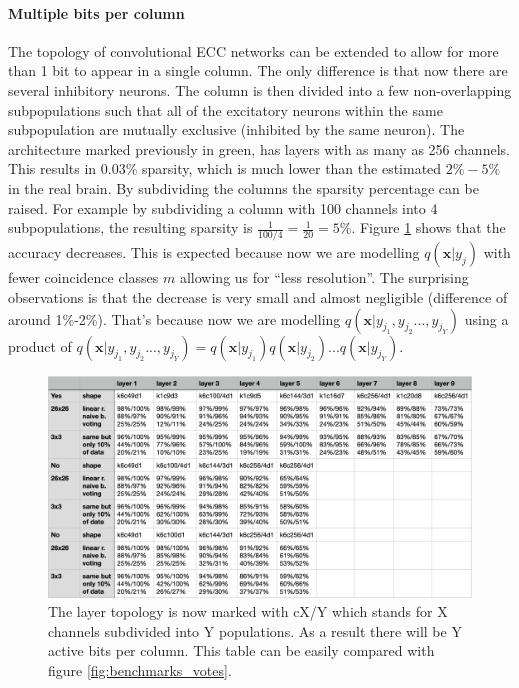 \documentclass[12pt]{article}
\begin{document}
\paragraph{Multiple bits per column} The topology of convolutional ECC networks can be extended to allow for more than 1 bit to appear in a single column. The only difference is that now there are several inhibitory neurons. The column is then divided into a few non-overlapping subpopulations such that all of the excitatory neurons within the same subpopulation are mutually exclusive (inhibited by the same neuron). The architecture marked previously in green, has layers with as many as 256 channels. This results in $0.03\%$ sparsity, which is much lower than the estimated $2\%-5\%$ in the real brain. By subdividing the columns the sparsity percentage can be raised. For example by subdividing a column with 100 channels into 4 subpopulations, the resulting sparsity is $\frac{1}{100/4}=\frac{1}{20}=5\%$. Figure \ref{fig:benchmarks_k} shows that the accuracy decreases. This is expected because now we are modelling $q(\boldsymbol{x}|y_j)$ with fewer coincidence classes $m$ allowing us for ``less resolution''. The surprising observations is that the decrease is very small and almost negligible (difference of around 1\%-2\%). That's because now  we are modelling $q(\boldsymbol{x}|y_{j_1},y_{j_2}...,y_{j_Y})$ using a product of  $q(\boldsymbol{x}|y_{j_1},y_{j_2}...,y_{j_Y})=q(\boldsymbol{x}|y_{j_1})q(\boldsymbol{x}|y_{j_2})...q(\boldsymbol{x}|y_{j_Y})$. 

\begin{figure}[!htbp]
	\centering
	\includegraphics[width=13.8cm]{benchmarks_k}
	\caption{The layer topology is now marked with cX/Y which stands for X channels subdivided into Y populations. As a result there will be Y active bits per column. This table can be easily compared with figure \ref{fig:benchmarks_votes}.}
	\label{fig:benchmarks_k}
\end{figure} 
\end{document}

